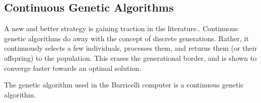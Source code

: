 \subsection{Continuous Genetic Algorithms}

A new and better strategy is gaining traction in the literature..
Continuous genetic algorithms do away with the concept of discrete generations.
Rather, it continuously selects a few individuals, processes them, and returns them (or their offspring) to the population.
This erases the generational border, and is shown  to converge faster towards an optimal solution.

The genetic algorithm used in the Barricelli computer is a continuous genetic algorithm.


